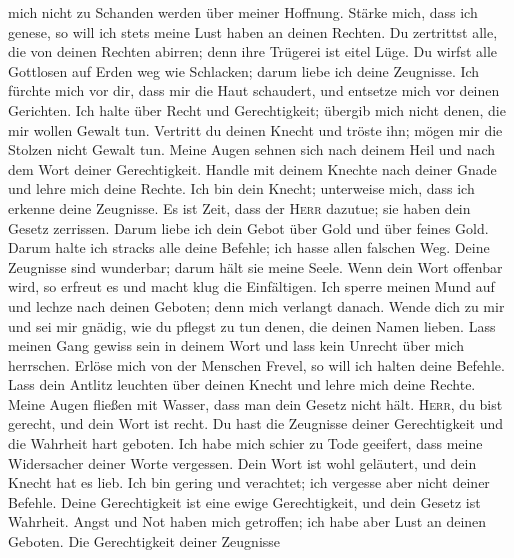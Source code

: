 mich nicht zu Schanden werden über meiner Hoffnung. 
Stärke mich, dass ich genese, so will ich stets meine Lust haben an
deinen Rechten.  Du zertrittst alle, die von deinen
Rechten abirren; denn ihre Trügerei ist eitel Lüge.  Du
wirfst alle Gottlosen auf Erden weg wie Schlacken; darum liebe ich deine
Zeugnisse.  Ich fürchte mich vor dir, dass mir die Haut
schaudert, und entsetze mich vor deinen Gerichten.  Ich
halte über Recht und Gerechtigkeit; übergib mich nicht denen, die mir
wollen Gewalt tun.  Vertritt du deinen Knecht und tröste
ihn; mögen mir die Stolzen nicht Gewalt tun.  Meine
Augen sehnen sich nach deinem Heil und nach dem Wort deiner
Gerechtigkeit.  Handle mit deinem Knechte nach deiner
Gnade und lehre mich deine Rechte.  Ich bin dein Knecht;
unterweise mich, dass ich erkenne deine Zeugnisse.  Es
ist Zeit, dass der \textsc{Herr} dazutue; sie haben dein Gesetz
zerrissen.  Darum liebe ich dein Gebot über Gold und
über feines Gold.  Darum halte ich stracks alle deine
Befehle; ich hasse allen falschen Weg.  Deine Zeugnisse
sind wunderbar; darum hält sie meine Seele.  Wenn dein
Wort offenbar wird, so erfreut es und macht klug die Einfältigen.
 Ich sperre meinen Mund auf und lechze nach deinen
Geboten; denn mich verlangt danach.  Wende dich zu mir
und sei mir gnädig, wie du pflegst zu tun denen, die deinen Namen
lieben.  Lass meinen Gang gewiss sein in deinem Wort und
lass kein Unrecht über mich herrschen.  Erlöse mich von
der Menschen Frevel, so will ich halten deine Befehle. 
Lass dein Antlitz leuchten über deinen Knecht und lehre mich deine
Rechte.  Meine Augen fließen mit Wasser, dass man dein
Gesetz nicht hält.  \textsc{Herr}, du bist gerecht, und
dein Wort ist recht.  Du hast die Zeugnisse deiner
Gerechtigkeit und die Wahrheit hart geboten.  Ich habe
mich schier zu Tode geeifert, dass meine Widersacher deiner Worte
vergessen.  Dein Wort ist wohl geläutert, und dein
Knecht hat es lieb.  Ich bin gering und verachtet; ich
vergesse aber nicht deiner Befehle.  Deine Gerechtigkeit
ist eine ewige Gerechtigkeit, und dein Gesetz ist Wahrheit.
 Angst und Not haben mich getroffen; ich habe aber Lust
an deinen Geboten.  Die Gerechtigkeit deiner Zeugnisse
